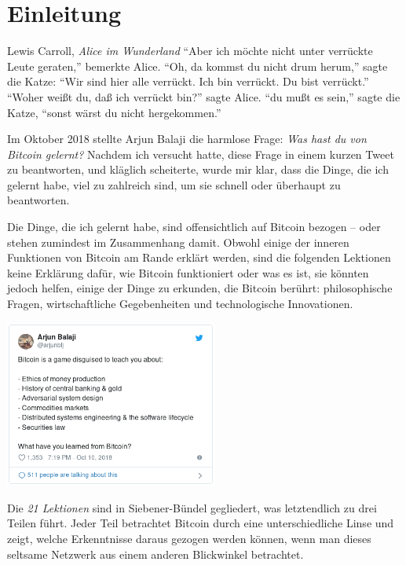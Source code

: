 \chapter*{Einleitung}
\label{ch:introduction}

\begin{chapquote}{Lewis Carroll, \textit{Alice im Wunderland}}
\enquote{Aber ich möchte nicht unter verrückte Leute geraten,} bemerkte Alice.
\enquote{Oh, da kommst du nicht drum herum,} sagte die Katze: \enquote{Wir sind
hier alle verrückt. Ich bin verrückt. Du bist verrückt.} \enquote{Woher weißt
du, daß ich verrückt bin?} sagte Alice. \enquote{du mußt es sein,} sagte die
Katze, \enquote{sonst wärst du nicht hergekommen.}
\end{chapquote}

Im Oktober 2018 stellte Arjun Balaji die harmlose Frage: \textit{Was hast du von
Bitcoin gelernt?} Nachdem ich versucht hatte, diese Frage in einem kurzen Tweet
zu beantworten, und kläglich scheiterte, wurde mir klar, dass die Dinge, die ich
gelernt habe, viel zu zahlreich sind, um sie schnell oder überhaupt zu
beantworten.

Die Dinge, die ich gelernt habe, sind offensichtlich auf Bitcoin bezogen – oder
stehen zumindest im Zusammenhang damit. Obwohl einige der inneren Funktionen von
Bitcoin am Rande erklärt werden, sind die folgenden Lektionen keine Erklärung
dafür, wie Bitcoin funktioniert oder was es ist, sie könnten jedoch helfen,
einige der Dinge zu erkunden, die Bitcoin berührt: philosophische Fragen,
wirtschaftliche Gegebenheiten und technologische Innovationen.

\begin{center}
  \includegraphics[width=7cm]{assets/images/the-tweet.png}
\end{center}

Die \textit{21 Lektionen} sind in Siebener-Bündel gegliedert, was letztendlich
zu drei Teilen führt. Jeder Teil betrachtet Bitcoin durch eine
unterschiedliche Linse und zeigt, welche Erkenntnisse daraus gezogen werden
können, wenn man dieses seltsame Netzwerk aus einem anderen Blickwinkel
betrachtet.


